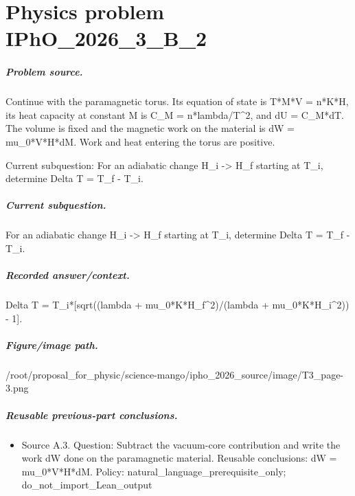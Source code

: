 
\chapter{Physics problem IPhO\_2026\_3\_B\_2}
\label{ch:IPhO2026Problems_problem_IPhO_2026_3_B_2}

\paragraph{Problem source.}
Continue with the paramagnetic torus.  Its equation of state is T*M*V = n*K*H,
its heat capacity at constant M is C\_M = n*lambda/T\textasciicircum{}2, and dU = C\_M*dT.
The volume is fixed and the magnetic work on the material is
dW = mu\_0*V*H*dM.  Work and heat entering the torus are positive.

Current subquestion:
For an adiabatic change H\_i -> H\_f starting at T\_i, determine Delta T = T\_f - T\_i.

\paragraph{Current subquestion.}
For an adiabatic change H\_i -> H\_f starting at T\_i, determine Delta T = T\_f - T\_i.

\paragraph{Recorded answer/context.}
Delta T = T\_i*[sqrt((lambda + mu\_0*K*H\_f\textasciicircum{}2)/(lambda + mu\_0*K*H\_i\textasciicircum{}2)) - 1].

\paragraph{Figure/image path.}
/root/proposal\_for\_physic/science-mango/ipho\_2026\_source/image/T3\_page-3.png

\paragraph{Reusable previous-part conclusions.}
\begin{itemize}
\item Source A.3. Question: Subtract the vacuum-core contribution and write the work dW done on the paramagnetic material. Reusable conclusions: dW = mu\_0*V*H*dM. Policy: natural\_language\_prerequisite\_only; do\_not\_import\_Lean\_output
\end{itemize}

